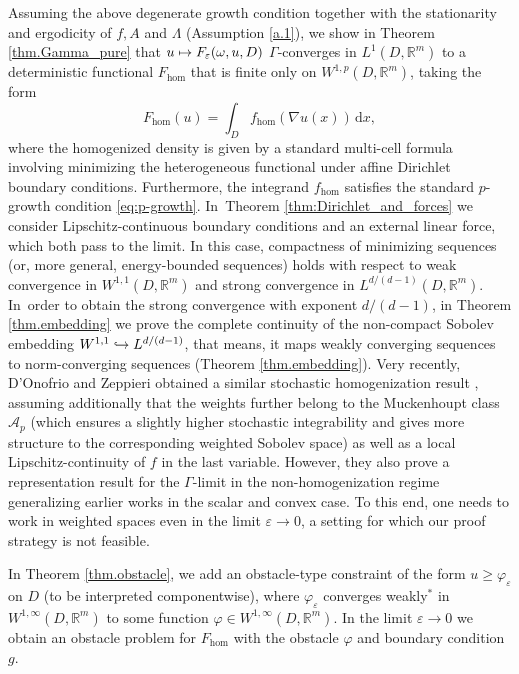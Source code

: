 \documentclass[10pt]{amsart}
\def\mto{\mathchoice{\longmapsto}{\mapsto}{\mapsto}{\mapsto}}
\def\hto{\mathrel{\lhook\joinrel\to}}
\theoremstyle{definition}
\let\e\varepsilon
\let\w\omega
\newcommand{\dx}{\,\mathrm{d}x}
\newcommand{\R}{\mathbb{R}}
\begin{document}
Assuming the above degenerate growth condition together with the stationarity and ergodicity of $f,A$ and $\Lambda$ (\cf Assumption \ref{a.1}), we show in Theorem \ref{thm.Gamma_pure} that $u\mto F_{\e}(\w,u,D)$ $\Gamma$-converges in $L^1(D,\R^m)$ to a deterministic functional $F_{\hom}$ that is finite only on $W^{1,p}(D,\R^m)$, taking the form\vspace*{-3pt}
\begin{equation*}
F_{\hom}(u)=\int_D f_{\hom}(\nabla u(x))\dx,
\end{equation*}
where the homogenized density is given by a standard multi-cell formula involving minimizing the heterogeneous functional under affine Dirichlet boundary conditions. Furthermore, the integrand $f_{\hom}$ satisfies the standard $p$-growth condition \eqref{eq:p-growth}. In~Theorem \ref{thm:Dirichlet_and_forces} we consider Lipschitz-continuous boundary conditions and an external linear force, which both pass to the limit. In this case, compactness of minimizing sequences (or, more general, energy-bounded sequences) holds with respect to weak convergence in $W^{1,1}(D,\R^m)$ and strong convergence in $L^{d/(d-1)}(D,\R^m)$. In~order to obtain the strong convergence with exponent $d/(d-1)$, in Theorem \ref{thm.embedding} we prove the complete continuity of the non-compact Sobolev embedding $W^{1,1}\hto\nobreak L^{d/(d-1)}$, that means, it maps weakly converging sequences to norm-converging sequences (\cf Theorem \ref{thm.embedding}). Very recently, D'Onofrio and Zeppieri obtained a similar stochastic homogenization result \cite{D'OnZe}, assuming additionally that the weights further belong to the Muckenhoupt class $\mathcal{A}_p$ (which ensures a slightly higher stochastic integrability and gives more structure to the corresponding weighted Sobolev space) as well as a local Lipschitz-continuity of $f$ in the last variable. However, they also prove a representation result for the $\Gamma$-limit in the non-homogenization regime generalizing earlier works \cite{CaSo,DeArc} in the scalar and convex case. To this end, one needs to work in weighted spaces even in the limit $\e\to 0$, a setting for which our proof strategy is not feasible.

In Theorem \ref{thm.obstacle}, we add an obstacle-type constraint of the form $u\geq\varphi_{\e}$ on $D$ (to be interpreted componentwise), where $\varphi_{\e}$ converges weakly$^*$ in $W^{1,\infty}(D,\R^m)$ to some function $\varphi\in W^{1,\infty}(D,\R^m)$. In the limit $\e\to 0$ we obtain an obstacle problem for $F_{\hom}$ with the obstacle $\varphi$ and boundary condition $g$.
\end{document}
